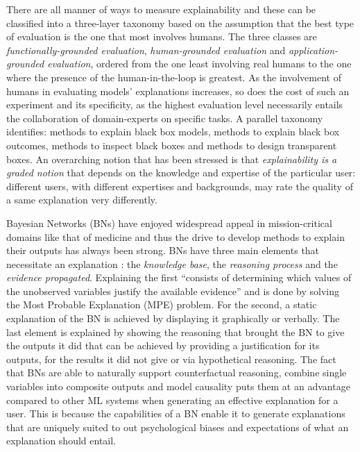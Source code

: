 There are all manner of ways to measure explainability and these can be classified into a three-layer taxonomy \citep{doshi2017towards} based on the assumption that the best type of evaluation is the one that most involves humans.
The three classes are \textit{functionally-grounded evaluation}, \textit{human-grounded evaluation} and \textit{application-grounded evaluation}, ordered from the one least involving real humans to the one where the presence of the human-in-the-loop is greatest.
As the involvement of humans in evaluating models' explanations increases, so does the cost of such an experiment and its specificity, as the highest evaluation level necessarily entails the collaboration of domain-experts on specific tasks.
A parallel taxonomy identifies: methods to explain black box models, methods to explain black box outcomes, methods to inspect black boxes and methods to design transparent boxes.
An overarching notion that has been stressed is that \textit{explainability is a graded notion} that depends on the knowledge and expertise of the particular user: different users, with different expertises and backgrounds, may rate the quality of a same explanation very differently.

Bayesian Networks (BNs) have enjoyed widespread appeal in mission-critical domains like that of medicine and thus the drive to develop methods to explain their outputs has always been strong.
BNs have three main elements that necessitate an explanation \citep{lacave2002review}: the \textit{knowledge base}, the \textit{reasoning process} and the \textit{evidence propagated}.
Explaining the first \enquote{consists of determining which values of the unobserved variables justify the available evidence} and is done by solving the Most Probable Explanation (MPE) problem.
For the second, a static explanation of the BN is achieved by displaying it graphically or verbally.
The last element is explained by showing the reasoning that brought the BN to give the outputs it did that can be achieved by providing a justification for its outputs, for the results it did not give or via hypothetical reasoning.
The fact that BNs are able to naturally support counterfactual reasoning, combine single variables into composite outputs and model causality puts them at an advantage compared to other ML systems when generating an effective explanation for a user.
This is because the capabilities of a BN enable it to generate explanations that are uniquely suited to out psychological biases and expectations of what an explanation should entail.

